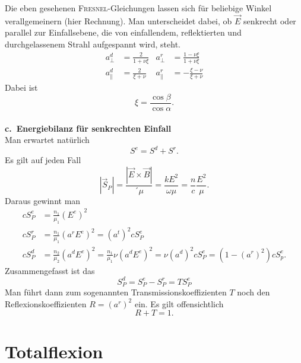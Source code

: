 Die eben gesehenen \textsc{Fresnel}-Gleichungen lassen sich für beliebige Winkel verallgemeinern (hier Rechnung). Man unterscheidet dabei, ob $\vec{E}$ senkrecht oder parallel zur Einfallsebene, die von einfallendem, reflektierten und durchgelassenem Strahl aufgespannt wird, steht.
\begin{align*}
a_\perp^d&=\frac{2}{1+\nu\xi} & a_\perp^r&=\frac{1-\nu\xi}{1+\nu\xi}\\
a_\parallel^d&=\frac{2}{\xi+\nu} &a_\parallel^r &=-\frac{\xi-\nu}{\xi+\nu}
\end{align*}
Dabei ist
\begin{equation*}
\xi=\frac{\cos\beta}{\cos\alpha}.
\end{equation*}
\ \\ \linebreak
\textbf{c.\ Energiebilanz für senkrechten Einfall}\\

Man erwartet natürlich
\begin{equation*}
S^e=S^d+S^r.
\end{equation*}
Es gilt auf jeden Fall
\begin{equation*}
|\vec{S}_P|=\frac{|\vec{E}\times\vec{B}|}{´\mu}=\frac{kE^2}{\omega\mu}=\frac{n}{c}\frac{E^2}{\mu}.
\end{equation*}
Daraus gewinnt man
\begin{align*}
cS_P^e &=\frac{n_1}{\mu_1}\left(E^e\right)^2 \\
cS_P^r &= \frac{n_1}{\mu_1}\left(a^rE^e\right)^2 = \left(a^t\right)^2cS_P^e\\
cS_P^d &=\frac{n_2}{\mu_2}\left(a^dE^e\right)^2 = \frac{n_1}{\mu_1}\nu\left(a^dE^e\right)^2 = \nu\left(a^d\right)^2cS_P^e=\left(1-\left(a^r\right)^2\right)cS_p^e.
\end{align*}
Zusammengefasst ist das
\begin{equation*}
S_P^d=S_P^e-S_P^r=TS_P^e
\end{equation*}
Man führt dann zum sogenannten Transmissionskoeffizienten $T$ noch den Reflexionskoeffizienten $R=\left(a^r\right)^2$ ein. Es gilt offensichtlich
\begin{equation*}
R+T=1.
\end{equation*}

\section{Totalflexion}

